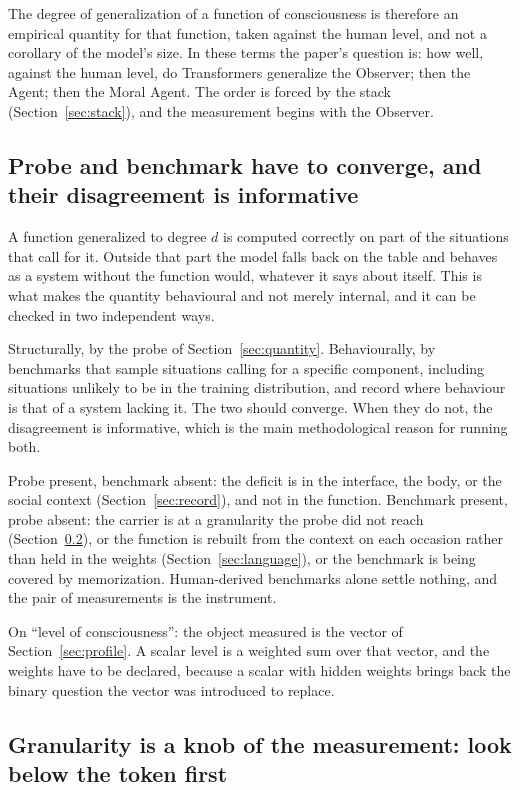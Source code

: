 The degree of generalization of a function of consciousness is therefore an empirical quantity for that
function, taken against the human level, and not a corollary of the model's size. In these terms the
paper's question is: how well, against the human level, do Transformers generalize the Observer; then the
Agent; then the Moral Agent. The order is forced by the stack (Section~\ref{sec:stack}), and the
measurement begins with the Observer.

\subsection{Probe and benchmark have to converge, and their disagreement is informative}
\label{sec:twomeasurements}

A function generalized to degree $d$ is computed correctly on part of the situations that call for it.
Outside that part the model falls back on the table and behaves as a system without the function would,
whatever it says about itself. This is what makes the quantity behavioural and not merely internal, and
it can be checked in two independent ways.

Structurally, by the probe of Section~\ref{sec:quantity}. Behaviourally, by benchmarks that sample
situations calling for a specific component, including situations unlikely to be in the training
distribution, and record where behaviour is that of a system lacking it. The two should converge. When
they do not, the disagreement is informative, which is the main methodological reason for running both.

Probe present, benchmark absent: the deficit is in the interface, the body, or the social context
(Section~\ref{sec:record}), and not in the function. Benchmark present, probe absent: the carrier is at a granularity the
probe did not reach (Section~\ref{sec:granularity}), or the function is rebuilt from the context on each
occasion rather than held in the weights (Section~\ref{sec:language}), or the benchmark is being covered
by memorization. Human-derived benchmarks alone settle nothing, and the pair of measurements is the
instrument.

On ``level of consciousness'': the object measured is the vector of Section~\ref{sec:profile}. A scalar
level is a weighted sum over that vector, and the weights have to be declared, because a scalar with
hidden weights brings back the binary question the vector was introduced to replace.

\subsection{Granularity is a knob of the measurement: look below the token first}
\label{sec:granularity}

